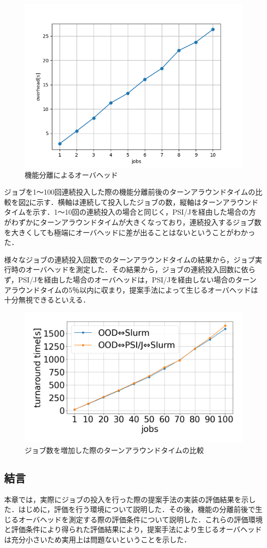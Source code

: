 \begin{figure}[tb]
    \centering
    \includegraphics[width=120mm]{./fig/1-10_overhead.png}
    \caption{機能分離によるオーバヘッド}
    \label{fig9}
\end{figure}


ジョブを1～100回連続投入した際の機能分離前後のターンアラウンドタイムの比較を図\ref{fig10}に示す．横軸は連続して投入したジョブの数，縦軸はターンアラウンドタイムを示す．1～10回の連続投入の場合と同じく，PSI/Jを経由した場合の方がわずかにターンアラウンドタイムが大きくなっており，連続投入するジョブ数を大きくしても極端にオーバヘッドに差が出ることはないということがわかった．\par
様々なジョブの連続投入回数でのターンアラウンドタイムの結果から，ジョブ実行時のオーバヘッドを測定した．その結果から，ジョブの連続投入回数に依らず，PSI/Jを経由した場合のオーバヘッドは，PSI/Jを経由しない場合のターンアラウンドタイムの5％以内に収まり，提案手法によって生じるオーバヘッドは十分無視できるといえる．\par

\begin{figure}[tb]
    \centering
    \includegraphics[width=120mm]{./fig/100jobs.png}
    \caption{ジョブ数を増加した際のターンアラウンドタイムの比較}
    \label{fig10}
\end{figure}

\subsection{結言}
本章では，実際にジョブの投入を行った際の提案手法の実装の評価結果を示した．はじめに，評価を行う環境について説明した．その後，機能の分離前後で生じるオーバヘッドを測定する際の評価条件について説明した．これらの評価環境と評価条件により得られた評価結果により，提案手法により生じるオーバヘッドは充分小さいため実用上は問題ないということを示した．\par